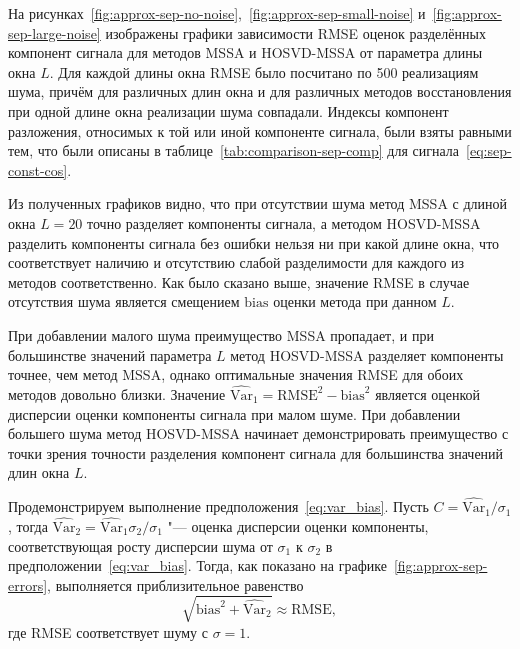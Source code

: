 \documentclass[specialist,
    substylefile=spbu.rtx,
    subf,href,colorlinks=true, 12pt]{disser}
\theoremstyle{plain}
\theoremstyle{definition}
\theoremstyle{remark}
\begin{document}
    На рисунках~\ref{fig:approx-sep-no-noise},~\ref{fig:approx-sep-small-noise} и~\ref{fig:approx-sep-large-noise}
    изображены графики зависимости RMSE оценок разделённых компонент сигнала для методов MSSA и HOSVD-MSSA от
    параметра длины окна $L$.
    Для каждой длины окна RMSE было посчитано по 500 реализациям шума, причём для различных длин окна
    и для различных методов восстановления при одной длине окна реализации шума совпадали.
    Индексы компонент разложения, относимых к той или иной компоненте сигнала, были взяты равными тем, что
    были описаны в таблице~\ref{tab:comparison-sep-comp} для сигнала~\eqref{eq:sep-const-cos}.

    Из полученных графиков видно, что при отсутствии шума метод MSSA с длиной окна $L=20$ точно разделяет
    компоненты сигнала, а методом HOSVD-MSSA разделить компоненты сигнала без ошибки нельзя ни при какой длине окна,
    что соответствует наличию и отсутствию слабой разделимости для каждого из методов соответственно.
    Как было сказано выше, значение RMSE в случае отсутствия шума является смещением $\mathrm{bias}$ 
    оценки метода при данном $L$.

    При добавлении малого шума преимущество MSSA пропадает, и при большинстве значений параметра $L$ метод
    HOSVD-MSSA разделяет компоненты точнее, чем метод MSSA, однако оптимальные значения RMSE для обоих методов
    довольно близки.
    Значение $\widehat{\mathrm{Var}}_1 = \mathrm{RMSE}^2 - \mathrm{bias}^2$ является оценкой дисперсии оценки компоненты сигнала при
    малом шуме.
    При добавлении большего шума метод HOSVD-MSSA начинает демонстрировать преимущество с точки зрения точности
    разделения компонент сигнала для большинства значений длин окна $L$.

    
    Продемонстрируем выполнение предположения~\eqref{eq:var_bias}. 
    Пусть $C=\widehat{\mathrm{Var}}_1 / \sigma_1$,
    тогда $\widehat{\mathrm{Var}}_2 = \widehat{\mathrm{Var}}_1 \sigma_2 / \sigma_1$ "--- оценка дисперсии
    оценки компоненты, соответствующая росту дисперсии шума от $\sigma_1$ к $\sigma_2$ в
    предположении~\eqref{eq:var_bias}.
    Тогда, как показано на графике~\ref{fig:approx-sep-errors}, выполняется приблизительное равенство
    \[
        \sqrt{\mathrm{bias}^2 + \widehat{\mathrm{Var}}_2} \approx \mathrm{RMSE},
    \]
    где RMSE соответствует шуму с $\sigma = 1$.
\end{document}
